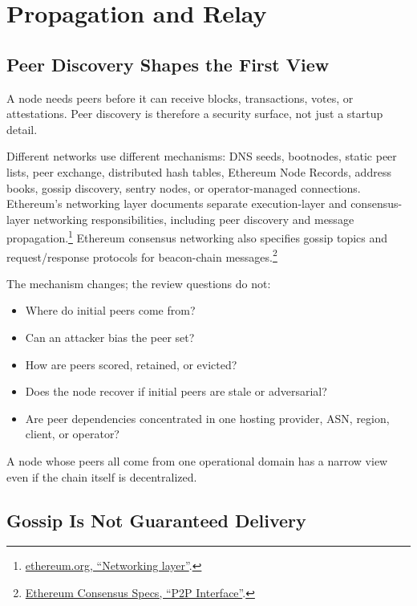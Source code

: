 \section{Propagation and Relay}

\subsection{Peer Discovery Shapes the First View}

A node needs peers before it can receive blocks, transactions, votes, or attestations. Peer discovery is therefore a security surface, not just a startup detail.

Different networks use different mechanisms: DNS seeds, bootnodes, static peer lists, peer exchange, distributed hash tables, Ethereum Node Records, address books, gossip discovery, sentry nodes, or operator-managed connections. Ethereum's networking layer documents separate execution-layer and consensus-layer networking responsibilities, including peer discovery and message propagation.\footnote{\href{https://ethereum.org/developers/docs/networking-layer/}{ethereum.org, ``Networking layer''}.} Ethereum consensus networking also specifies gossip topics and request/response protocols for beacon-chain messages.\footnote{\href{https://ethereum.github.io/consensus-specs/specs/phase0/p2p-interface/}{Ethereum Consensus Specs, ``P2P Interface''}.}

The mechanism changes; the review questions do not:

\begin{itemize}
\item Where do initial peers come from?
\item Can an attacker bias the peer set?
\item How are peers scored, retained, or evicted?
\item Does the node recover if initial peers are stale or adversarial?
\item Are peer dependencies concentrated in one hosting provider, ASN, region, client, or operator?
\end{itemize}

A node whose peers all come from one operational domain has a narrow view even if the chain itself is decentralized.

\subsection{Gossip Is Not Guaranteed Delivery}

